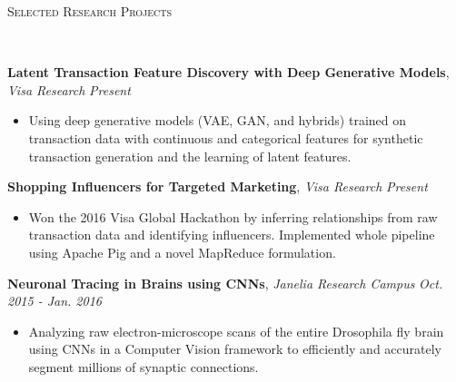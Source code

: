\documentclass[9pt]{article}
\newenvironment{changemargin}[2]{%
  \begin{list}{}{%
    \setlength{\topsep}{0pt}%
    \setlength{\leftmargin}{#1}%
    \setlength{\rightmargin}{#2}%
    \setlength{\listparindent}{\parindent}%
    \setlength{\itemindent}{\parindent}%
    \setlength{\parsep}{\parskip}%
  }%
  \item[]}{\end{list}
}
\newcommand{\lineover}{
	\begin{changemargin}{-0.05in}{-0.05in}
		\vspace*{-8pt}
		\hrulefill \\
		\vspace*{-2pt}
	\end{changemargin}
}
\newcommand{\header}[1]{
	\begin{changemargin}{-0.5in}{-0.5in}
		\scshape{#1}\\
  	\lineover
	\end{changemargin}
}
\newenvironment{body} {
	\vspace*{-16pt}
	\begin{changemargin}{-0.25in}{-0.5in}
  }	
	{\end{changemargin}
}
\begin{document}
\header{Selected Research Projects}
\begin{body}
	\vspace{16pt}
    \textbf{Latent Transaction Feature Discovery with Deep Generative Models}, \emph{Visa Research} \hfill \emph{Present}
    \vspace*{-3pt}
    \begin{itemize} \itemsep -0pt
	\item Using deep generative models (VAE, GAN, and hybrids) trained on transaction data with continuous and categorical features for synthetic transaction generation and the learning of latent features.
	\end{itemize}
	\vspace*{-3pt}
    \textbf{Shopping Influencers for Targeted Marketing}, \emph{Visa Research} \hfill \emph{Present} \\
		\vspace*{-3pt}
	\begin{itemize} \itemsep -0pt
	\item Won the 2016 Visa Global Hackathon by inferring relationships from raw transaction data and identifying influencers. Implemented whole pipeline using Apache Pig and a novel MapReduce formulation.
	\end{itemize}
    \vspace{-3pt}
	\textbf{Neuronal Tracing in Brains using CNNs}, \emph{Janelia Research Campus} \hfill \emph{Oct. 2015 - Jan. 2016}
	\vspace*{-3pt}
	\begin{itemize} \itemsep -0pt
	\item Analyzing raw electron-microscope scans of the entire Drosophila fly brain using CNNs in a Computer Vision framework to efficiently and accurately segment millions of synaptic connections.
	\end{itemize}

\end{body}
\end{document}
